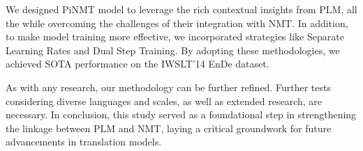 \documentclass[conference]{IEEEtran}
\begin{document}
We designed PiNMT model to leverage the rich contextual insights from PLM, all the while overcoming the challenges of their integration with NMT. In addition, to make model training more effective, we incorporated strategies like Separate Learning Rates and Dual Step Training. By adopting these methodologies, we achieved SOTA performance on the IWSLT'14 EnDe dataset.

As with any research, our methodology can be further refined. Further tests considering diverse languages and scales, as well as extended research, are necessary. In conclusion, this study served as a foundational step in strengthening the linkage between PLM and NMT, laying a critical groundwork for future advancements in translation models.





\end{document}
